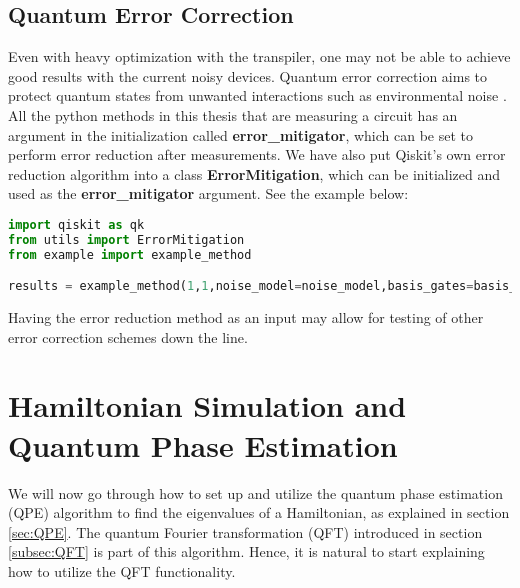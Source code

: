 \subsection{Quantum Error Correction}
\label{subsec:QiskitErrorReduction}
Even with heavy optimization with the transpiler, one may not be able to achieve good results with the current noisy devices. Quantum error correction aims to protect quantum states from unwanted interactions such as environmental noise \cite{ErrorCorrection}. All the python methods in this thesis that are measuring a circuit has an argument in the initialization called \textbf{error\_mitigator}, which can be set to perform error reduction after measurements. We have also put Qiskit's own error reduction algorithm into a class \textbf{ErrorMitigation}, which can be initialized and used as the \textbf{error\_mitigator} argument. See the example below:
\begin{lstlisting}[language=Python,numbers=none]
import qiskit as qk
from utils import ErrorMitigation
from example import example_method

results = example_method(1,1,noise_model=noise_model,basis_gates=basis_gates,coupling_map=coupling_map,error_mitigator=ErrorMitigation() )

\end{lstlisting}
Having the error reduction method as an input may allow for testing of other error correction schemes down the line. 


\section{Hamiltonian Simulation and Quantum Phase Estimation}
\label{sec:MethodsQPE}
We will now go through how to set up and utilize the quantum phase estimation (QPE) algorithm to find the eigenvalues of a Hamiltonian, as explained in section \ref{sec:QPE}. The quantum Fourier transformation (QFT) introduced in section \ref{subsec:QFT} is part of this algorithm. Hence, it is natural to start explaining how to utilize the QFT functionality.

